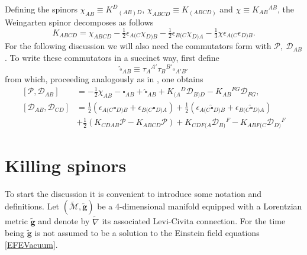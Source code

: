 \documentclass[10pt,a4paper]{article}
\theoremstyle{plain}
\def\bmg{{\bm g}}
\begin{document}
Defining the spinors $\chi_{AB}\equiv K^D{}_{(AB)D}$,
$\chi_{ABCD}\equiv K_{(ABCD)}$ and $\chi\equiv K_{AB}{}^{AB}$, the
Weingarten spinor decomposes as follows
\begin{equation}
\label{ExtrinsicCurvatureSplit}
K_{ABCD} = \chi_{ABCD} - \tfrac{1}{2} \epsilon_{A(C}\chi_{D)B} -
\tfrac{1}{2} \epsilon_{B(C}\chi_{D)A} - \tfrac{1}{3} \chi
\epsilon_{A(C} \epsilon_{D)B}.
\end{equation}
For the following discussion we will also need the commutators form
with $\mathcal{P},~\mathcal{D}_{AB}$. To write these commutators in a
succinct way, first define
\[\widehat{\square}_{AB}\equiv \tau_A{}^{A'}\tau_B{}^{B'}\square_{A'B'}\]
from which, proceeding analogously as in \cite{BaeVal10b}, one obtains
\begin{align}
 \left[\mathcal{P},\mathcal{D}_{AB}
   \right]&=-\tfrac{1}{2}\chi_{AB}-\square_{AB}+\widehat{\square}_{AB}
+K_{(A}{}^D\mathcal{D}_{B)D}-K_{AB}{}^{FG}\mathcal{D}_{FG}, \label{CommutatorNormalSenDeriv}
\\ \left[\mathcal{D}_{AB},\mathcal{D}_{CD}\right]&=
\tfrac{1}{2}\left(\epsilon_{A(C}\square_{D)B}+\epsilon_{B(C}\square_{D)A}\right)
+\tfrac{1}{2}\left(\epsilon_{A(C}\widehat{\square}_{D)B}+\epsilon_{B(C}\widehat{\square}_{D)A}\right)
 \nonumber \\ &
 +\tfrac{1}{2}\left(K_{CDAB}\mathcal{P}-K_{ABCD}\mathcal{P}\right)
+K_{CDF(A}\mathcal{D}_{B)}{}^F-K_{ABF(C}\mathcal{D}_{D)}{}^F \label{CommutatorSenSenDeriv}
\end{align}


\section{Killing spinors}\label{Sec:KillingSpinors}

To start the discussion it is convenient to introduce some notation
and definitions. Let $(\tilde{\mathcal{M}},\tilde{\bmg})$ be a
4-dimensional manifold equipped with a Lorentzian metric
$\tilde{\bmg}$ and denote by $\tilde{\nabla}$ its associated
Levi-Civita connection.  For the time being $\tilde{\bmg}$ is not
assumed to be a solution to the Einstein field equations
\eqref{EFEVacuum}.
\end{document}
